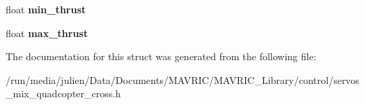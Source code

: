 \begin{DoxyCompactItemize}
\item 
\hypertarget{structservo__mix__quadcopter__cross__conf__t_ac60e30002af38f6a2807807ceaae0fe4}{float {\bfseries min\+\_\+thrust}}\label{structservo__mix__quadcopter__cross__conf__t_ac60e30002af38f6a2807807ceaae0fe4}

\item 
\hypertarget{structservo__mix__quadcopter__cross__conf__t_ab577af494063849332f23245ac25c4b5}{float {\bfseries max\+\_\+thrust}}\label{structservo__mix__quadcopter__cross__conf__t_ab577af494063849332f23245ac25c4b5}

\end{DoxyCompactItemize}


The documentation for this struct was generated from the following file\+:\begin{DoxyCompactItemize}
\item 
/run/media/julien/\+Data/\+Documents/\+M\+A\+V\+R\+I\+C/\+M\+A\+V\+R\+I\+C\+\_\+\+Library/control/servos\+\_\+mix\+\_\+quadcopter\+\_\+cross.\+h\end{DoxyCompactItemize}
